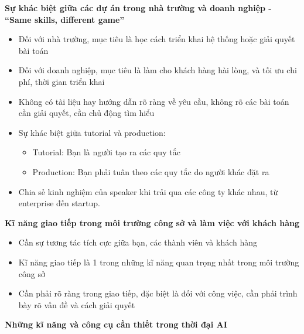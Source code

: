 \vspace{0.5em}\noindent\textbf{Sự khác biệt giữa các dự án trong nhà trường và doanh nghiệp
- ``Same skills, different
game''}\par

\begin{itemize}
\tightlist
\item
  Đối với nhà trường, mục tiêu là học cách triển khai hệ thống hoặc giải
  quyết bài toán
\item
  Đối với doanh nghiệp, mục tiêu là làm cho khách hàng hài lòng, và tối
  ưu chi phí, thời gian triển khai
\item
  Không có tài liệu hay hướng dẫn rõ ràng về yêu cầu, không rõ các bài
  toán cần giải quyết, cần chủ động tìm hiểu
\item
  Sự khác biệt giữa tutorial và production:

  \begin{itemize}
  \tightlist
  \item
    Tutorial: Bạn là người tạo ra các quy tắc
  \item
    Production: Bạn phải tuân theo các quy tắc do người khác đặt ra
  \end{itemize}
\item
  Chia sẻ kinh nghiệm của speaker khi trải qua các công ty khác nhau, từ
  enterprise đến startup.
\end{itemize}

\vspace{0.5em}\noindent\textbf{Kĩ năng giao tiếp trong môi trường công sở và làm việc với
khách
hàng}\par

\begin{itemize}
\tightlist
\item
  Cần sự tương tác tích cực giữa bạn, các thành viên và khách hàng
\item
  Kĩ năng giao tiếp là 1 trong những kĩ năng quan trọng nhất trong môi
  trường công sở
\item
  Cần phải rõ ràng trong giao tiếp, đặc biệt là đối với công việc, cần
  phải trình bày rõ vấn đề và cách giải quyết
\end{itemize}

\vspace{0.5em}\noindent\textbf{Những kĩ năng và công cụ cần thiết trong thời đại
AI}\par


